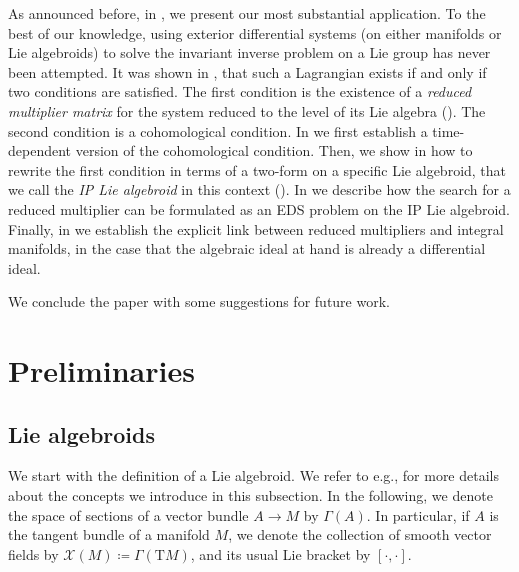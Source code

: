 \documentclass[11pt]{article}
\theoremstyle{plain}
\theoremstyle{definition}
\begin{document}
As announced before, in , we present our most substantial application. To the best of our knowledge, using exterior differential systems (on either manifolds or Lie algebroids) to solve the invariant inverse problem  on a Lie group has never been attempted. It was shown in \cite{crampin2008invariantinv}, that such a Lagrangian exists if and only if two conditions are satisfied. The first condition is the existence of a \emph{reduced multiplier matrix} for the system reduced to the level of its Lie algebra (). The second condition is a cohomological condition. In  we first establish a time-dependent version of the cohomological  condition. Then, we show in  how to rewrite the first condition in terms of a two-form on a specific Lie algebroid, that we call the \emph{IP Lie algebroid} in this context (). In  we describe how the search for a reduced multiplier can be formulated as an EDS problem  on the IP Lie algebroid. Finally, in  we establish the explicit link between reduced multipliers and integral manifolds, in the case that the algebraic ideal at hand is already a differential ideal.  

We conclude the paper with some suggestions for future work.

\section{Preliminaries}\label{sec:preliminaries}
\subsection{Lie algebroids}

We start with the definition of a Lie algebroid. We refer to e.g., \cite{mackenzie1987algebroid,marle2008algebroid} for more details about the concepts we introduce in this subsection. In the following, we denote the space of sections of a vector bundle $A\to M$ by $\Gamma(A)$. In particular, if $A$ is the tangent bundle of a manifold $M$, we denote the collection of smooth vector fields by $\mathcal{X}(M)\coloneqq \Gamma(\mathrm{T}M)$, and its usual Lie bracket by $[\cdot,\cdot]$.
\end{document}

